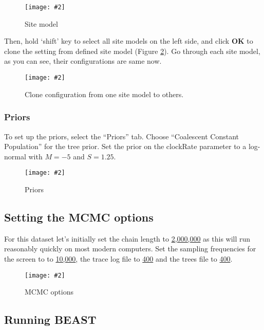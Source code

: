 \documentclass[12pt]{article}
\newcommand{\includeimage}[2][]{%
\texttt{[image: \#2]}
}
\newcommand{\chainLength}{{2,000,000}}
\newcommand{\logEvery}{{400}}
\newcommand{\screenEvery}{{10,000}}
\begin{document}
\begin{figure}
\centering	
\includeimage[width=0.8\textwidth]{figures/BEAUti_Site_Model}
\label{fig:BEAUti_Site_Model}
\caption{Site model}
\end{figure}

Then, hold `shift' key to select all site models on the left side, and click \textbf{OK} to clone the setting from defined site model (Figure \ref{fig:cloneFrom}). Go through each site model, as you can see, their configurations are same now. 

\begin{figure}
\centering	
\includeimage[width=0.8\textwidth]{figures/cloneFrom}
\caption{Clone configuration from one site model to others.}
\label{fig:cloneFrom}
\end{figure}


\subsubsection{Priors }

To set up the priors, select the ``Priors'' tab.
Choose ``Coalescent Constant Population'' for the tree prior. Set the prior on the clockRate parameter to a log-normal with $M=-5$ and $S=1.25$. 

\begin{figure}
\centering	
\includeimage[width=0.8\textwidth]{figures/BEAUti_priors}
\label{fig:BEAUti_priors}
\caption{Priors}
\end{figure}


\subsection{Setting the MCMC options}

For this dataset let's initially set the chain length to \underline{\chainLength{}} as this will run 
reasonably quickly on most modern computers. Set the sampling frequencies for the screen to
to \underline{\screenEvery{}}, the trace log file to \underline{\logEvery{}} and the trees file to \underline{\logEvery{}}.

\begin{figure}
\centering	
\includeimage[width=0.8\textwidth]{figures/BEAUti_mcmc}
\label{fig:BEAUti_mcmc}
\caption{MCMC options}
\end{figure}


\subsection*{Running BEAST}
\end{document}
